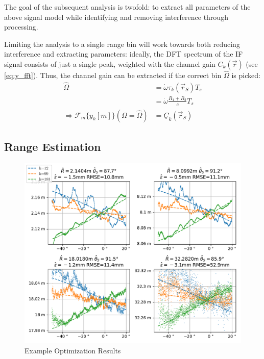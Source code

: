 The goal of the subsequent analysis is twofold:
to extract all parameters of the above signal model while identifying and removing interference through processing.

Limiting the analysis to a single range bin will work towards both reducing interference and extracting parameters:
ideally, the DFT spectrum of the IF signal consists of just a single peak,
weighted with the channel gain $C_k(\vec r)$ (see \autoref{eq:y_fft}).
Thus, the channel gain can be extracted if the correct bin $\hat \Omega$ is picked:
\begin{align}
    \hat \Omega                                               & = \dot \omega \tau_k(\vec r_S)T_s    \\
                                                              & = \dot \omega \frac{R_1+R_2}{c}T_s      \\
    \Rightarrow \mathcal{F}_m\{y_k[m]\}(\Omega = \hat \Omega) & =    \underline C_k(\vec r_S) \label{eq:G_fft}
\end{align}

\subsection{Range Estimation}
\label{sec:range_est}

\begin{figure}
    \centering
    \includegraphics[width=\textwidth]{../figures/reflpos_estimate.pdf}
    \caption{Example Optimization Results}
    \label{fig:reflpos_estimate}
\end{figure}

